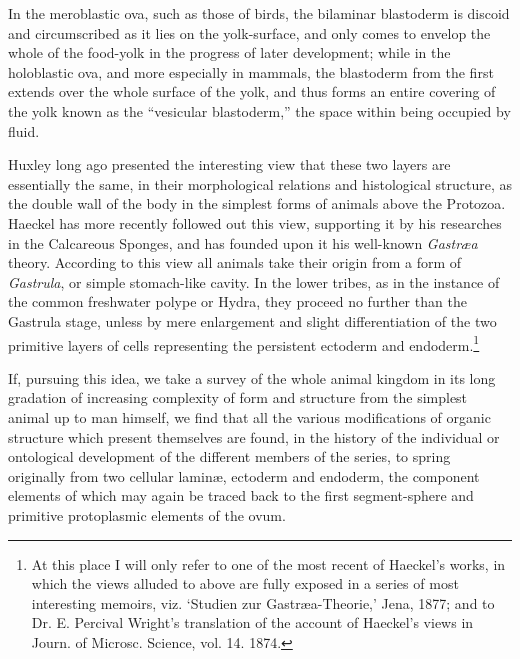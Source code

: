 \documentclass[a4paper, 11pt, oneside, english]{article}
\begin{document}
In the meroblastic ova, such as those of birds, the bilaminar blastoderm is discoid and circumscribed as it lies on the yolk-surface, and only comes to envelop the whole of the food-yolk in the progress of later development; while in the holoblastic ova, and more especially in mammals, the blastoderm from the first extends over the whole surface of the yolk, and thus forms an entire covering of the yolk known as the ``vesicular blastoderm,'' the space within being occupied by fluid.

Huxley long ago presented the interesting view that these two layers are essentially the same, in their morphological relations and histological structure, as the double wall of the body in the simplest forms of animals above the Protozoa. Haeckel has more recently followed out this view, supporting it by his researches in the Calcareous Sponges, and has founded upon it his well-known \emph{Gastræa} theory. According to this view all animals take their origin from a form of \emph{Gastrula}, or simple stomach-like cavity. In the lower tribes, as in the instance of the common freshwater polype or Hydra, they proceed no further than the Gastrula stage, unless by mere enlargement and slight differentiation of the two primitive layers of cells representing the persistent ectoderm and endoderm.\footnote{At this place I will only refer to one of the most recent of Haeckel's works, in which the views alluded to above are fully exposed in a series of most interesting memoirs, viz. `Studien zur Gastræa-Theorie,' Jena, 1877; and to Dr. E. Percival Wright's translation of the account of Haeckel's views in Journ. of Microsc. Science, vol. 14. 1874.}

If, pursuing this idea, we take a survey of the whole animal kingdom in its long gradation of increasing complexity of form and structure from the simplest animal up to man himself, we find that all the various modifications of organic structure which present themselves are found, in the history of the individual or ontological development of the different members of the series, to spring originally from two cellular laminæ, ectoderm and endoderm, the component elements of which may again be traced back to the first segment-sphere and primitive protoplasmic elements of the ovum.
\end{document}

